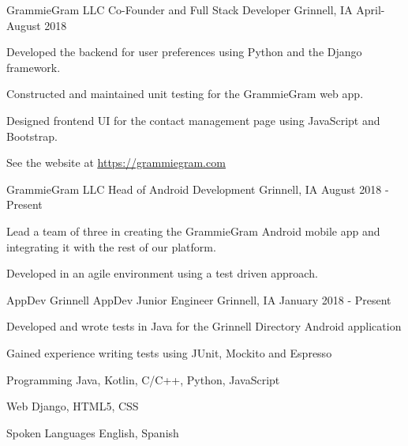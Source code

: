 \documentclass[12pt, a4paper]{awesome-cv}
\begin{document}
\begin{cventries}
  \cventry
    {GrammieGram LLC}
    {Co-Founder and Full Stack Developer}
    {Grinnell, IA}
    {April-August 2018}
    {
      \begin{cvitems}
        \item {Developed the backend for user preferences using Python and the Django framework.}
        \item {Constructed and maintained unit testing for the GrammieGram web app.}
        \item {Designed frontend UI for the contact management page using JavaScript and Bootstrap.}
	\item {See the website at \underline{\href{https://grammiegram.com}{https://grammiegram.com}}}
      \end{cvitems}
    }

  \cventry
    {GrammieGram LLC}
    {Head of Android Development}
    {Grinnell, IA}
    {August 2018 - Present}
    {
      \begin{cvitems}
        \item {Lead a team of three in creating the GrammieGram Android mobile app and integrating it with the rest of our platform.}
	\item {Developed in an agile environment using a test driven approach.}
      \end{cvitems}
    }

  \cventry
    {AppDev Grinnell}
    {AppDev Junior Engineer}
    {Grinnell, IA}
    {January 2018 - Present}
    {
      \begin{cvitems}
        \item {Developed and wrote tests in Java for the Grinnell Directory Android application}
	\item {Gained experience writing tests using JUnit, Mockito and Espresso}
      \end{cvitems}
    }

\end{cventries}


\begin{cvskills}
  \cvskill
    {Programming} 
    {Java, Kotlin, C/C++, Python, JavaScript} 

  \cvskill
    {Web} 
    {Django, HTML5, CSS} 


  \cvskill
    {Spoken Languages} 
    {English, Spanish} 

\end{cvskills}
\end{document}
